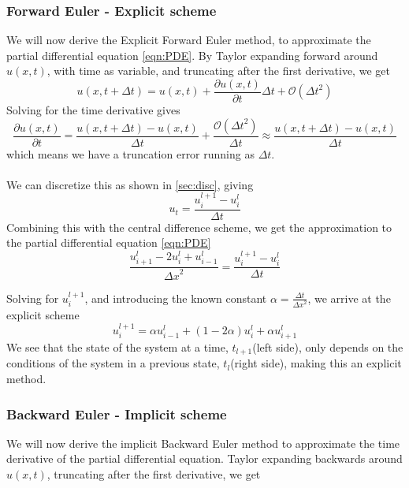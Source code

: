 \documentclass[10pt,a4paper]{article}
\newcommand{\bigO}{{\mathcal{O}}}
\newcommand{\dt}{{\Delta t}}
\newcommand{\dx}{{\Delta x}}
\newcommand{\pt}{{\partial t}}
\newcommand{\pu}{{\partial u}}
\begin{document}
\subsubsection{Forward Euler - Explicit scheme}
We will now derive the Explicit Forward Euler method, to approximate the partial differential equation \ref{eqn:PDE}. By Taylor expanding forward around $u(x,t)$, with time as variable, and truncating after the first derivative, we get
\begin{equation}
u(x,t+\dt) = u(x,t) + \frac{\pu(x,t)}{\pt}\dt + \bigO(\dt^2)
\end{equation}
Solving for the time derivative gives
\begin{equation}
\frac{\pu(x,t)}{\pt} = \frac{u(x,t+\dt) - u(x,t)}{\dt} + \frac{\bigO(\dt^2)}{\dt} \approx \frac{u(x,t+\dt) - u(x,t)}{\dt}
\end{equation}
which means we have a truncation error running as $\dt$.
\\\\
We can discretize this as shown in \ref{sec:disc}, giving
\begin{equation}
u_t = \frac{u_i^{l+1} - u_i^l}{\dt}
\end{equation}
Combining this with the central difference scheme, we get the approximation to the partial differential equation \vref{eqn:PDE}
\begin{equation}
\frac{u_{i+1}^l - 2u_i^l+u_{i-1}^l}{\dx^2} = \frac{u_i^{l+1} - u_i^l}{\dt}
\end{equation}

Solving for $u_i^{l+1}$, and introducing the known constant $\alpha = \frac{\dt}{\dx^2}$, we arrive at the explicit scheme
\begin{equation}\label{eq:1dscheme:fe}
u_i^{l+1} = \alpha u_{i-1}^l + (1-2\alpha)u_i^l + \alpha u_{i+1}^l
\end{equation}
We see that the state of the system at a time, $t_{l+1}$(left side), only depends on the conditions of the system in a previous state, $t_l$(right side), making this an explicit method.


\subsubsection{Backward Euler - Implicit scheme}\label{sec:method_be}
We will now derive the implicit Backward Euler method to approximate the time derivative of the partial differential equation. Taylor expanding backwards around $u(x,t)$, truncating after the first derivative, we get
\end{document}
